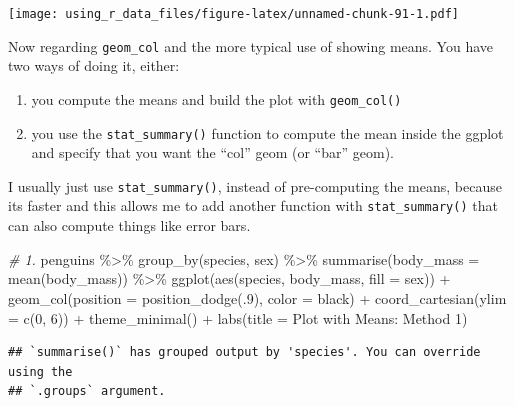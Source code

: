 \documentclass[
]{book}
\newenvironment{Shaded}{\begin{snugshade}}{\end{snugshade}}
\newcommand{\AttributeTok}[1]{\textcolor[rgb]{0.77,0.63,0.00}{#1}}
\newcommand{\CommentTok}[1]{\textcolor[rgb]{0.56,0.35,0.01}{\textit{#1}}}
\newcommand{\DecValTok}[1]{\textcolor[rgb]{0.00,0.00,0.81}{#1}}
\newcommand{\FunctionTok}[1]{\textcolor[rgb]{0.00,0.00,0.00}{#1}}
\newcommand{\NormalTok}[1]{#1}
\newcommand{\SpecialCharTok}[1]{\textcolor[rgb]{0.00,0.00,0.00}{#1}}
\newcommand{\StringTok}[1]{\textcolor[rgb]{0.31,0.60,0.02}{#1}}
\begin{document}
\texttt{[image: using\_r\_data\_files/figure-latex/unnamed-chunk-91-1.pdf]}

Now regarding \texttt{geom\_col} and the more typical use of showing means.
You have two ways of doing it, either:

\begin{enumerate}
\def\labelenumi{\arabic{enumi}.}
\item
  you compute the means and build the plot with \texttt{geom\_col()}
\item
  you use the \texttt{stat\_summary()} function to compute the mean inside the ggplot and specify that you want the ``col'' geom (or ``bar'' geom).
\end{enumerate}

I usually just use \texttt{stat\_summary()}, instead of pre-computing the means, because its faster and this allows me to add another function with \texttt{stat\_summary()} that can also compute things like error bars.

\begin{Shaded}
\begin{Highlighting}[]
\CommentTok{\# 1. }
\NormalTok{penguins }\SpecialCharTok{\%\textgreater{}\%} 
  \FunctionTok{group\_by}\NormalTok{(species, sex) }\SpecialCharTok{\%\textgreater{}\%} 
  \FunctionTok{summarise}\NormalTok{(}\AttributeTok{body\_mass =} \FunctionTok{mean}\NormalTok{(body\_mass)) }\SpecialCharTok{\%\textgreater{}\%} 
  \FunctionTok{ggplot}\NormalTok{(}\FunctionTok{aes}\NormalTok{(species, body\_mass, }\AttributeTok{fill =}\NormalTok{ sex)) }\SpecialCharTok{+}
  \FunctionTok{geom\_col}\NormalTok{(}\AttributeTok{position =} \FunctionTok{position\_dodge}\NormalTok{(.}\DecValTok{9}\NormalTok{), }\AttributeTok{color =} \StringTok{\textquotesingle{}black\textquotesingle{}}\NormalTok{) }\SpecialCharTok{+}
  \FunctionTok{coord\_cartesian}\NormalTok{(}\AttributeTok{ylim =} \FunctionTok{c}\NormalTok{(}\DecValTok{0}\NormalTok{, }\DecValTok{6}\NormalTok{)) }\SpecialCharTok{+} 
  \FunctionTok{theme\_minimal}\NormalTok{() }\SpecialCharTok{+} 
  \FunctionTok{labs}\NormalTok{(}\AttributeTok{title =} \StringTok{\textquotesingle{}Plot with Means: Method 1\textquotesingle{}}\NormalTok{)}
\end{Highlighting}
\end{Shaded}

\begin{verbatim}
## `summarise()` has grouped output by 'species'. You can override using the
## `.groups` argument.
\end{verbatim}
\end{document}
